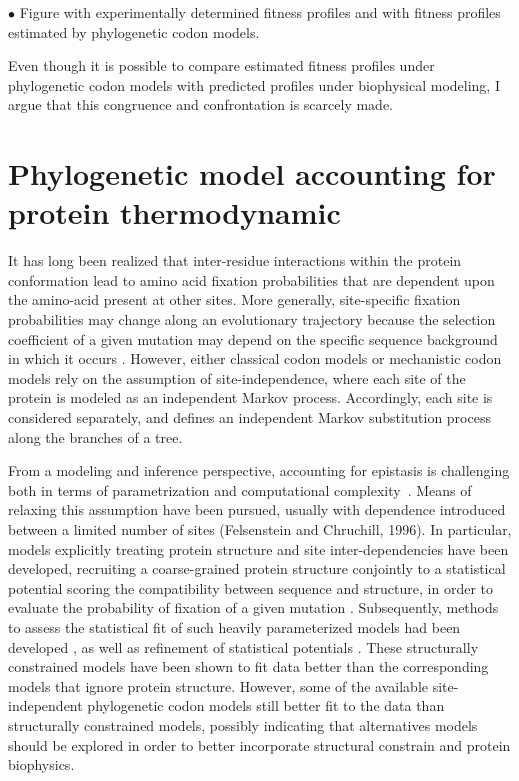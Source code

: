 $\bullet$ Figure with experimentally determined fitness profiles and with fitness profiles estimated by phylogenetic codon models.

Even though it is possible to compare estimated fitness profiles under phylogenetic codon models with predicted profiles under biophysical modeling, I argue that this congruence and confrontation is scarcely made.

\section{Phylogenetic model accounting for protein thermodynamic}

It has long been realized that inter-residue interactions within the protein conformation lead to amino acid fixation probabilities that are dependent upon the amino-acid present at other sites.
More generally, site-specific fixation probabilities may change along an evolutionary trajectory because the selection coefficient of a given mutation may depend on the specific sequence background in which it occurs \cite{Goldstein2016}.
However, either classical codon models or mechanistic codon models rely on the assumption of site-independence, where each site of the protein is modeled as an independent Markov process.
Accordingly, each site is considered separately, and defines an independent Markov substitution process along the branches of a tree.

From a modeling and inference perspective, accounting for epistasis is challenging both in terms of parametrization and computational complexity~\citep{Manhart2014}.
Means of relaxing this assumption have been pursued, usually with dependence introduced between a limited number of sites (Felsenstein and Chruchill, 1996).
In particular, models explicitly treating protein structure and site inter-dependencies have been developed, recruiting a coarse-grained protein structure conjointly to a statistical potential scoring the compatibility between sequence and structure, in order to evaluate the probability of fixation of a given mutation \citep{Rodrigue2005}.
Subsequently, methods to assess the statistical fit of such heavily parameterized models had been developed \citep{Rodrigue2009}, as well as refinement of statistical potentials \citep{Kleinman2010}.
These structurally constrained models have been shown to fit data better than the corresponding models that ignore protein structure.
However, some of the available site-independent phylogenetic codon models still better fit to the data than structurally constrained models, possibly indicating that alternatives models should be explored in order to better incorporate structural constrain and protein biophysics.

